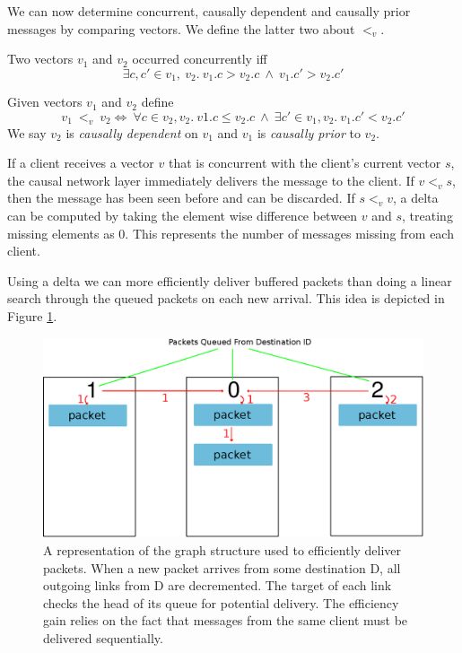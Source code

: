 \documentclass[12pt,a4paper,twoside,openright]{report}
\begin{document}
		We can now determine concurrent, causally dependent and causally prior messages by comparing vectors. We define the latter two about $<_v$.
				
		Two vectors $v_1$ and $v_2$ occurred concurrently iff \[\exists c,c' \in v_1,\ v_2.\ v_1.c > v_2.c\ \land\ v_1.c' > v_2.c'\]
		
		Given vectors $v_1$ and $v_2$ define \[v_1\ <_v\ v_2 \iff\ \forall c \in v_2, v_2.\ v1.c \leq v_2.c\ \land\ \exists c' \in v_1, v_2.\ v_1.c' < v_2.c'\]
		We say $v_2$ is \textit{causally dependent} on $v_1$ and $v_1$ is \textit{causally prior} to $v_2$.
		
		If a client receives a vector $v$ that is concurrent with the client's current vector $s$, the causal network layer immediately delivers the message to the client. If $v <_v s$, then the message has been seen before and can be discarded. If $s <_v v$, a delta can be computed by taking the element wise difference between $v$ and $s$, treating missing elements as $0$. This represents the number of messages missing from each client. 
		
		Using a delta we can more efficiently deliver buffered packets than doing a linear search through the queued packets on each new arrival. This idea is depicted in Figure \ref{fig:efficient}.
 		\begin{figure}[htb]
 		\centering
 		\includegraphics[width=1\linewidth]{figs/efficient_message_buffer.eps}
 		\caption[Dependency Graph in Message Buffer]{A representation of the graph structure used to efficiently deliver packets. When a new packet arrives from some destination D, all outgoing links from D are decremented. The target of each link checks the head of its queue for potential delivery. The efficiency gain relies on the fact that messages from the same client must be delivered sequentially.}
 		\label{fig:efficient}
 		\end{figure}
		
\end{document}
